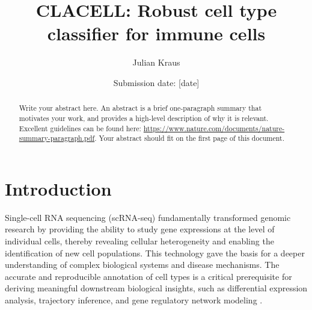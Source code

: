\documentclass[11pt]{article}
\title{CLACELL: Robust cell type classifier for immune cells}
\author{Julian Kraus}
\affil{
Project report\\ %
Module title: Project Biomedical Network Science\\%
Semester: SS2026\\%
Matriculation number: 23766907\\
Biomedical Network Science Lab, Department Artificial Intelligence in Biomedical Engineering, Friedrich-Alexander-Universität Erlangen-Nürnberg}
\date{Submission date: [date]}
\begin{document}
\maketitle

\begin{abstract}
Write your abstract here. An abstract is a brief one-paragraph summary that motivates your work, and provides a high-level description of why it is relevant. Excellent guidelines can be found here: \url{https://www.nature.com/documents/nature-summary-paragraph.pdf}. Your abstract should fit on the first page of this document.
\end{abstract}

\clearpage

\tableofcontents

\clearpage

\section{Introduction}\label{sec:introduction}



Single-cell RNA sequencing (scRNA-seq) fundamentally transformed genomic research by providing the ability to study gene expressions at the level of individual cells, thereby revealing cellular heterogeneity and enabling the identification of new cell populations. This technology gave the basis for a deeper understanding of complex biological systems and disease mechanisms. 
The accurate and reproducible annotation of cell types is a critical prerequisite for deriving meaningful downstream biological insights, such as differential expression analysis, trajectory inference, and gene regulatory network modeling \cite{abdelaal_comparison_2019, luecken_current_2019}. %
\end{document}
